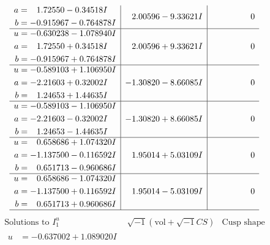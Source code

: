 \documentclass[1p]{elsarticle_modified}
\theoremstyle{definition}
\newcommand{\I}{\sqrt{-1}}
\begin{document}
$$\begin{array}{c|c|c}
\begin{aligned}
a &= \phantom{-}1.72550 - 0.34518 I \\
b &= -0.915967 - 0.764878 I\end{aligned}
 & \phantom{-}2.00596 - 9.33621 I & \phantom{-0.000000 } 0 \\ \hline\begin{aligned}
u &= -0.630238 - 1.078940 I \\
a &= \phantom{-}1.72550 + 0.34518 I \\
b &= -0.915967 + 0.764878 I\end{aligned}
 & \phantom{-}2.00596 + 9.33621 I & \phantom{-0.000000 } 0 \\ \hline\begin{aligned}
u &= -0.589103 + 1.106950 I \\
a &= -2.21603 + 0.32002 I \\
b &= \phantom{-}1.24653 + 1.44635 I\end{aligned}
 & -1.30820 - 8.66085 I & \phantom{-0.000000 } 0 \\ \hline\begin{aligned}
u &= -0.589103 - 1.106950 I \\
a &= -2.21603 - 0.32002 I \\
b &= \phantom{-}1.24653 - 1.44635 I\end{aligned}
 & -1.30820 + 8.66085 I & \phantom{-0.000000 } 0 \\ \hline\begin{aligned}
u &= \phantom{-}0.658686 + 1.074320 I \\
a &= -1.137500 - 0.116592 I \\
b &= \phantom{-}0.651713 - 0.960686 I\end{aligned}
 & \phantom{-}1.95014 + 5.03109 I & \phantom{-0.000000 } 0 \\ \hline\begin{aligned}
u &= \phantom{-}0.658686 - 1.074320 I \\
a &= -1.137500 + 0.116592 I \\
b &= \phantom{-}0.651713 + 0.960686 I\end{aligned}
 & \phantom{-}1.95014 - 5.03109 I & \phantom{-0.000000 } 0\\
 \hline 
 \end{array}$$\newpage$$\begin{array}{c|c|c}  
\text{Solutions to }I^u_{1}& \I (\text{vol} + \sqrt{-1}CS) & \text{Cusp shape}\\
 \hline 
\begin{aligned}
u &= -0.637002 + 1.089020 I \\

\end{aligned}
\end{array}$$
\end{document}

